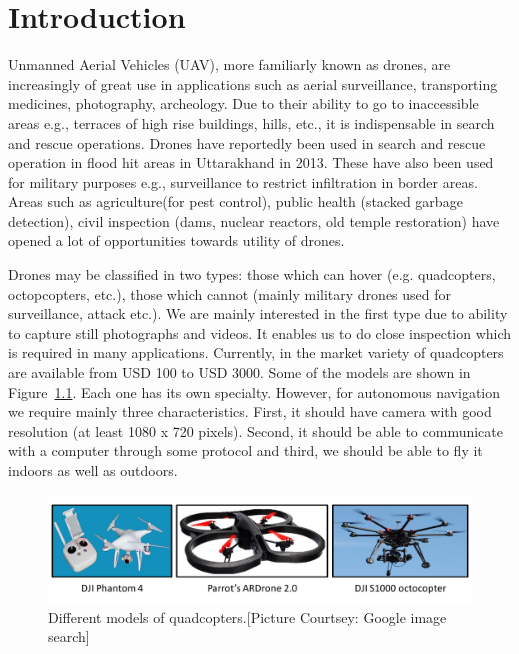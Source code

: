 \chapter{Introduction}
\label{ch:intro}
Unmanned Aerial Vehicles (UAV), more familiarly known as drones, are
increasingly of great use in applications such as aerial
surveillance\cite{dronesurvey1, dronesurvey3}, transporting
medicines\cite{dronedelivery1,dronedelivery2}, photography\cite{dronephoto1,
dronephoto2, dronephoto3}, archeology\cite{dronearchaeology}.
Due to their ability to go to inaccessible areas e.g., terraces of high rise
buildings, hills, etc., it is indispensable in search and rescue operations.
Drones have reportedly been used in search and rescue operation in flood hit
areas in Uttarakhand in 2013. These have also been used for military
purposes e.g., surveillance to restrict infiltration in border areas\cite{dronesurvey2}.
Areas such as agriculture(for pest control), public health (stacked garbage
detection), civil inspection (dams, nuclear reactors, old temple restoration) have 
opened a lot of opportunities towards utility of drones.

Drones may be classified in two types: those which can hover (e.g.
quadcopters, octopcopters, etc.), those which cannot (mainly military drones
used for surveillance, attack etc.). We are mainly interested in the first type due
to ability to capture still photographs and videos. It enables us to do
close inspection which is required in many applications. Currently, in the
market variety of quadcopters are available from USD 100 to USD 3000.
Some of the models are shown in Figure~\ref{fig:quadcopters}.
Each one has its own specialty. However, for autonomous navigation we require mainly
three characteristics. First, it should have camera with good resolution (at
least 1080 x 720 pixels). Second, it should be able to communicate with a
computer through some protocol and third, we should be able to fly it indoors as
well as outdoors.

\begin{figure}[h!]
\centering
\includegraphics[width=0.98\linewidth]{figures/quadcopters}
\caption[Different models of quadcopters]{Different models of
quadcopters.[Picture Courtsey: Google image search]}
\label{fig:quadcopters}
\end{figure}

